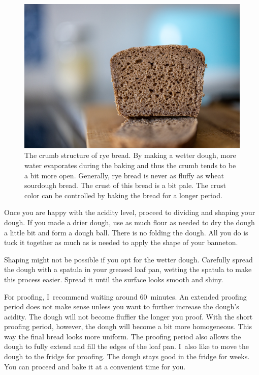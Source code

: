 \begin{figure}[!htb]
  \includegraphics[width=\textwidth]{crumb}
  \caption[Rye bread]{The crumb structure of rye bread. By making a wetter
  dough, more water evaporates during the baking and thus the
  crumb tends to be a bit more open. Generally, rye
  bread is never as fluffy as wheat sourdough bread. The crust
  of this bread is a bit pale. The crust color can be controlled
  by baking the bread for a longer period.}%
  \label{fig:rye-crumb}
\end{figure}

Once you are happy with the acidity level, proceed to dividing
and shaping your dough.  If you made a drier dough, use as much
flour as needed to dry the dough a little bit and form a dough ball.
There is no folding the dough. All you do is tuck it together
as much as is needed to apply the shape of your banneton.

Shaping might not be possible if you opt for the wetter dough. Carefully spread
the dough with a spatula in your greased loaf pan, wetting the spatula to make
this process easier. Spread it until the surface looks smooth and shiny.

For proofing, I~recommend waiting around 60~minutes. An extended
proofing period does not make sense unless you want to further
increase the dough's acidity. The dough will not become fluffier
the longer you proof. With the short proofing period, however,
the dough will become a bit more homogeneous. This way the final
bread looks more uniform. The proofing period also allows the
dough to fully extend and fill the edges of the loaf pan. I~also
like to move the dough to the fridge for proofing. The dough stays
good in the fridge for weeks. You can proceed and bake it at a
convenient time for you.

